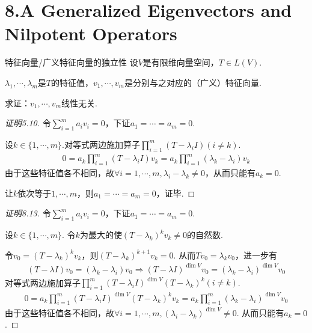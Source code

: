 \section{8.A Generalized Eigenvectors and Nilpotent Operators}

\begin{theorem}[5.10/8.13]\label{thm 5.10/8.13} 特征向量/广义特征向量的独立性 \:
    设\(V\)是有限维向量空间，\(T \in L(V)\).

    \(\lambda_1,\cdots,\lambda_m\)是\(T\)的特征值，\(v_1,\cdots,v_m\)是分别与之对应的（广义）特征向量.
    
    求证：\(v_1,\cdots,v_m\)线性无关.
\end{theorem}

\begin{proof}[证明5.10]
    令\(\sum_{i=1}^m a_iv_i=0\)，下证\(a_1=\cdots=a_m=0\).

    设\(k \in \{1,\cdots,m\}\).对等式两边施加算子\(\prod_{i=1}^m (T-\lambda_i I)(i \ne k)\).
        \begin{align*}
            0=a_{k}\prod_{i=1}^m (T-\lambda_i I) v_{k}=
            a_{k}\prod_{i=1}^m (\lambda_{k}-\lambda_i) v_{k}
        \end{align*}
    由于这些特征值各不相同，故\(\forall i=1,\cdots,m,\lambda_i-\lambda_{k} \ne 0\)，从而只能有\(a_{k}=0\).

    让\(k\)依次等于\(1,\cdots,m\)，则\(a_1=\cdots=a_m=0\)，证毕.
\end{proof}

\begin{proof}[证明8.13]
    令\(\sum_{i=1}^m a_iv_i=0\)，下证\(a_1=\cdots=a_m=0\).

    设\(k \in \{1,\cdots,m\}\).
    令\(k\)为最大的使\((T-\lambda_{k})^k v_{k} \ne 0\)的自然数.
    
    令\(v_0=(T-\lambda_{k})^k v_{k}\)，则\((T-\lambda_{k})^{k+1} v_{k}=0\).
    从而\(Tv_0=\lambda_{k}v_0\)，进一步有
        \begin{align*}
            (T-\lambda I)v_0=(\lambda_{k}-\lambda_i)v_0 \Rightarrow 
            (T-\lambda I)^{\dim V} v_0=(\lambda_{k}-\lambda_i)^{\dim V}v_0
        \end{align*}
    对等式两边施加算子\(\prod_{i=1}^m (T-\lambda_i I)^{\dim V}(T-\lambda_{k})^k(i \ne k)\).
        \begin{align*}
            0=a_{k}\prod_{i=1}^m (T-\lambda_i I)^{\dim V}(T-\lambda_{k})^k v_{k}
            =a_{k}\prod_{i=1}^m (\lambda_{k}-\lambda_i)^{\dim V} v_0
        \end{align*}
    由于这些特征值各不相同，故\(\forall i=1,\cdots,m,(\lambda_i-\lambda_{k})^{\dim V} \ne 0\).
    从而只能有\(a_{k}=0\).
\end{proof}

